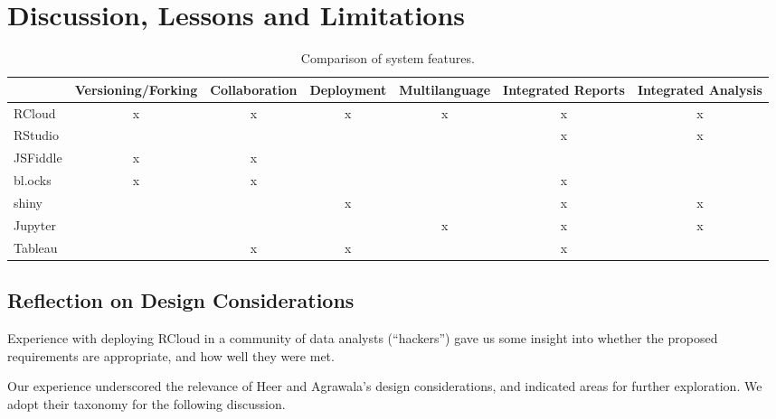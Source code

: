 \section{Discussion, Lessons and Limitations}
\label{sec:discussion}

\begin{table*}
  \centering
  \begin{tabular}{l|cccccc}
           & Versioning/Forking & Collaboration & Deployment & Multilanguage & Integrated Reports & Integrated Analysis \\
    \hline
RCloud     &       x            &       x       &     x      &      x        &           x        &           x         \\
RStudio    &                    &               &            &               &           x        &           x         \\
JSFiddle   &       x            &       x       &            &               &                    &                     \\
bl.ocks    &       x            &       x       &            &               &           x        &                     \\
shiny      &                    &               &     x      &               &           x        &           x         \\
Jupyter    &                    &               &            &      x        &           x        &           x         \\
Tableau    &                     &      x        &    x       &               &          x         &                     
  \end{tabular}
  \caption{Comparison of system features.}
\end{table*}

\subsection{Reflection on Design Considerations}

Experience with deploying RCloud in a community of data analysts
(``hackers'') gave us some insight into whether the proposed
requirements are appropriate, and how well they were met.

Our experience underscored the relevance of Heer and Agrawala's design
considerations, and indicated areas for further exploration. We adopt
their taxonomy for the following discussion.

